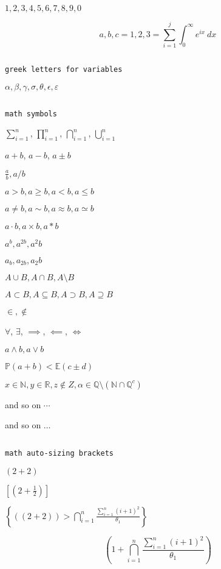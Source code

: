 \documentclass[11pt, oneside]{article}   	%
\newcommand{\bR}{\mathbb{R}} %
\newcommand{\bQ}{\mathbb{Q}} %
\newcommand{\bQc}{\mathbb{Q}^c} %
\newcommand{\bN}{\mathbb{N}} %
\newcommand{\bP}{\mathbb{P}} %
\newcommand{\bE}{\mathbb{E}} %
\newcommand{\bp}[1]{\left( #1 \right)}
\newcommand{\bb}[1]{\left[ #1 \right]}
\newcommand{\bc}[1]{\left\{ #1 \right \}}
\begin{document}
$1,2,3,4,5,6,7,8,9,0$ %

$$a,b,c = 1,2,3 = \sum_{i=1}^j \int_0^{\infty} e^{ix} \ dx$$

$\ $ %

\texttt{greek letters for variables}

$\alpha, \beta, \gamma, \sigma, \theta, \epsilon, \varepsilon$

$\ $

\texttt{math symbols}

$\sum_{i=1}^n$, $\prod_{i=1}^n$, $\bigcap_{i=1}^n$, $\bigcup_{i=1}^n$

$a+b$, $a-b$, $a \pm b$

$\frac{a}{b}, a/b$

$a > b, a \geq b, a < b, a \leq b$

$a \ne b, a \sim b, a \approx b, a \simeq b$

$a \cdot b, a \times b, a * b$

$a^b, a^{2b}, a^2b$

$a_b, a_{2b}, a_2b$ 

$A \cup B, A \cap B, A \setminus B$

$A \subset B, A \subseteq B, A \supset B, A \supseteq B$

$\in, \notin$

$\forall$, $\exists$, $\implies$, $\impliedby$, $\iff$

$a \land b, a \lor b$

$\bP(a+b) < \bE(c \pm d)$

$x \in \bN, y \in \bR, z \notin Z, \alpha \in \bQ\setminus(\bN \cap \bQc)$

and so on $\cdots$

and so on $\ldots$

$\ $

\texttt{math auto-sizing brackets}

$\bp{2+2}$

$\bb{\bp{2+\frac{1}{2}}}$

$\bc{\bp{\bp{2 + 2}} > \bigcap_{i=1}^n \frac{\sum_{i=1}^n \bp{i +1}^2}{\theta_1}}$

$$\bp{1 + \bigcap_{i=1}^n \frac{\sum_{i=1}^n \bp{i +1}^2}{\theta_1}}$$
\end{document}

